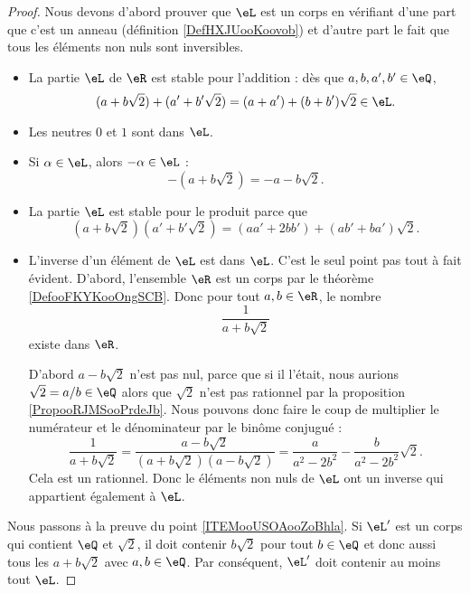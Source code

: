 \begin{proof}
	Nous devons d'abord prouver que \( \eL\) est un corps en vérifiant d'une part que c'est un anneau (définition \ref{DefHXJUooKoovob}) et d'autre part le fait que tous les éléments non nuls sont inversibles.
	\begin{itemize}
		\item La partie \( \eL\) de \( \eR\) est stable pour l'addition : dès que \( a,b,a',b'\in \eQ\),
		      \begin{equation}
			      (a+b\sqrt{ 2 })+(a'+b'\sqrt{ 2 })=(a+a')+(b+b')\sqrt{ 2 }\in \eL.
		      \end{equation}
		\item
		      Les neutres \( 0\) et \( 1\) sont dans \( \eL\).
		\item
		      Si \( \alpha\in \eL\), alors \( -\alpha\in \eL\) :
		      \begin{equation}
			      -(a+b\sqrt{ 2 })=-a-b\sqrt{ 2 }.
		      \end{equation}
		\item
		      La partie \( \eL\) est stable pour le produit parce que
		      \begin{equation}
			      (a+b\sqrt{ 2 })(a'+b'\sqrt{ 2 })=(aa'+2bb')+(ab'+ba')\sqrt{ 2 }.
		      \end{equation}
		\item
		      L'inverse d'un élément de \( \eL\) est dans \( \eL\). C'est le seul point pas tout à fait évident. D'abord, l'ensemble \( \eR\) est un corps par le théorème \ref{DefooFKYKooOngSCB}. Donc pour tout \( a,b\in \eR\), le nombre
		      \begin{equation}
			      \frac{1}{ a+b\sqrt{ 2 } }
		      \end{equation}
		      existe dans \( \eR\).

		      D'abord \( a-b\sqrt{ 2 }\) n'est pas nul, parce que si il l'était, nous aurions \( \sqrt{ 2 }=a/b\in \eQ\) alors que \( \sqrt{ 2 }\) n'est pas rationnel par la proposition \ref{PropooRJMSooPrdeJb}. Nous pouvons donc faire le coup de multiplier le numérateur et le dénominateur par le binôme conjugué :
		      \begin{equation}
			      \frac{1}{ a+b\sqrt{ 2 } }=\frac{ a-b\sqrt{ 2 } }{ (a+b\sqrt{ 2 })(a-b\sqrt{ 2 }) }=\frac{ a }{ a^2-2b^2 }-\frac{ b }{ a^2-2b^2 }\sqrt{ 2 }.
		      \end{equation}
		      Cela est un rationnel. Donc le éléments non nuls de \( \eL\) ont un inverse qui appartient également à \( \eL\).
	\end{itemize}
	Nous passons à la preuve du point \ref{ITEMooUSOAooZoBhla}. Si \( \eL'\) est un corps qui contient \( \eQ\) et \( \sqrt{ 2 }\), il doit contenir \( b\sqrt{ 2 }\) pour tout \( b\in \eQ\) et donc aussi tous les \( a+b\sqrt{ 2 }\) avec \( a,b\in \eQ\). Par conséquent, \( \eL'\) doit contenir au moins tout \( \eL\).
\end{proof}

